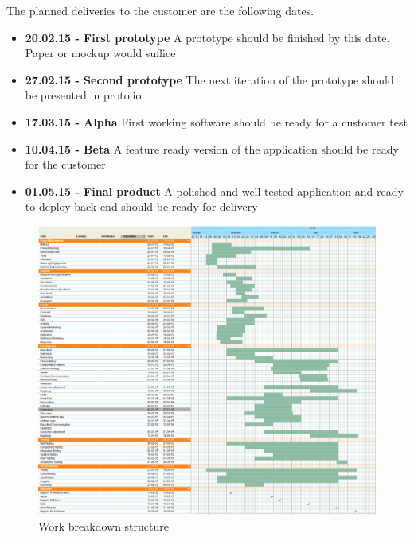 The planned deliveries to the customer are the following dates. 
\begin{itemize}
\item \textbf{20.02.15 - First prototype} \newline
A prototype should be finished by this date. Paper or mockup would suffice  
\item \textbf{27.02.15 - Second prototype}  \newline
The next iteration of the prototype should be presented in proto.io \cite{protoIO}
\item \textbf{17.03.15 - Alpha} \newline
First working software should be ready for a customer test
\item \textbf{10.04.15 - Beta}  \newline
A feature ready version of the application should be ready for the customer 
\item \textbf{01.05.15 - Final product} \newline
A polished and well tested application and ready to deploy back-end should be ready for delivery 
\end{itemize}


\begin{figure}[h!]
	\centering
	\includegraphics[width=\textwidth]{fig/gantt}
	\caption{Work breakdown structure}
	\label{Fig:gantt}
\end{figure}

